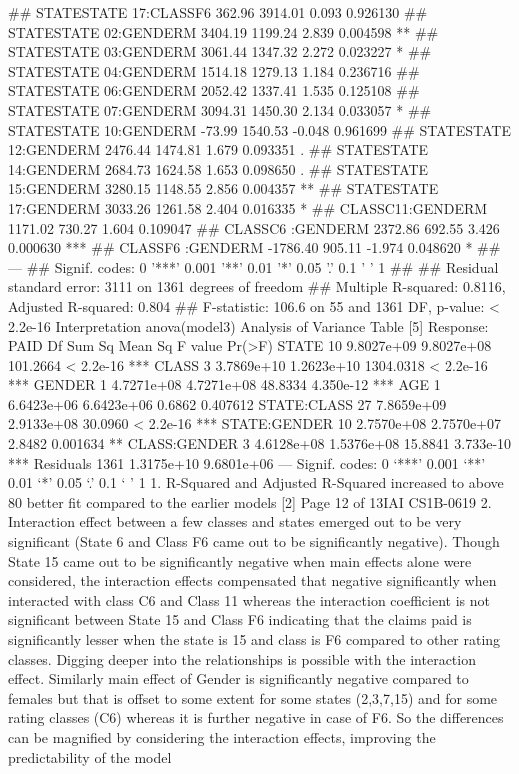 \documentclass[a4paper,12pt]{article}
\begin{document}
## STATESTATE 17:CLASSF6 362.96 3914.01 0.093 0.926130
## STATESTATE 02:GENDERM 3404.19 1199.24 2.839 0.004598 **
## STATESTATE 03:GENDERM 3061.44 1347.32 2.272 0.023227 *
## STATESTATE 04:GENDERM 1514.18 1279.13 1.184 0.236716
## STATESTATE 06:GENDERM 2052.42 1337.41 1.535 0.125108
## STATESTATE 07:GENDERM 3094.31 1450.30 2.134 0.033057 *
## STATESTATE 10:GENDERM -73.99 1540.53 -0.048 0.961699
## STATESTATE 12:GENDERM 2476.44 1474.81 1.679 0.093351 .
## STATESTATE 14:GENDERM 2684.73 1624.58 1.653 0.098650 .
## STATESTATE 15:GENDERM 3280.15 1148.55 2.856 0.004357 **
## STATESTATE 17:GENDERM 3033.26 1261.58 2.404 0.016335 *
## CLASSC11:GENDERM
1171.02 730.27 1.604 0.109047
## CLASSC6 :GENDERM
2372.86 692.55 3.426 0.000630 ***
## CLASSF6 :GENDERM
-1786.40 905.11 -1.974 0.048620 *
## ---
## Signif. codes: 0 '***' 0.001 '**' 0.01 '*' 0.05 '.' 0.1 ' ' 1
##
## Residual standard error: 3111 on 1361 degrees of freedom
## Multiple R-squared: 0.8116, Adjusted R-squared: 0.804
## F-statistic: 106.6 on 55 and 1361 DF, p-value: < 2.2e-16
Interpretation
anova(model3)
Analysis of Variance Table
[5]
Response: PAID
Df Sum Sq Mean Sq F value Pr(>F)
STATE
10 9.8027e+09 9.8027e+08 101.2664 < 2.2e-16 ***
CLASS
3 3.7869e+10 1.2623e+10 1304.0318 < 2.2e-16 ***
GENDER
1 4.7271e+08 4.7271e+08 48.8334 4.350e-12 ***
AGE
1 6.6423e+06 6.6423e+06 0.6862 0.407612
STATE:CLASS 27 7.8659e+09 2.9133e+08 30.0960 < 2.2e-16 ***
STATE:GENDER 10 2.7570e+08 2.7570e+07 2.8482 0.001634 **
CLASS:GENDER 3 4.6128e+08 1.5376e+08 15.8841 3.733e-10 ***
Residuals 1361 1.3175e+10 9.6801e+06
---
Signif. codes: 0 ‘***’ 0.001 ‘**’ 0.01 ‘*’ 0.05 ‘.’ 0.1 ‘ ’ 1
1. R-Squared and Adjusted R-Squared increased to above 80%
better fit compared to the earlier models
[2]
Page 12 of 13IAI
CS1B-0619
2. Interaction effect between a few classes and states emerged out to be very
significant (State 6 and Class F6 came out to be significantly negative). Though State
15 came out to be significantly negative when main effects alone were considered,
the interaction effects compensated that negative significantly when interacted with
class C6 and Class 11 whereas the interaction coefficient is not significant between
State 15 and Class F6 indicating that the claims paid is significantly lesser when the
state is 15 and class is F6 compared to other rating classes. Digging deeper into the
relationships is possible with the interaction effect. Similarly main effect of Gender is
significantly negative compared to females but that is offset to some extent for some
states (2,3,7,15) and for some rating classes (C6) whereas it is further negative in
case of F6. So the differences can be magnified by considering the interaction
effects, improving the predictability of the model
\end{document}
